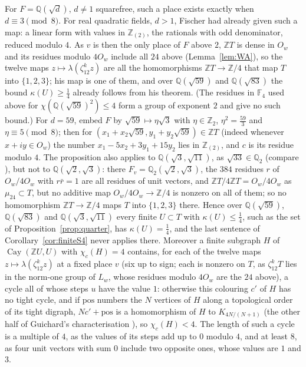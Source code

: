 \documentclass[11pt,a4paper]{amsart}
\theoremstyle{remark}
\newcommand{\Q}{\mathbb{Q}}
\newcommand{\Z}{\mathbb{Z}}
\newcommand{\F}{\mathbb{F}}
\newcommand{\Cay}{\operatorname{Cay}}
\begin{document}
For $F=\Q(\sqrt d)$, $d\ne1$ squarefree, such a place exists exactly when $d\equiv3\pmod8$. For real quadratic fields,
$d>1$, Fischer \cite[Theorem~10(i)]{Fischer1990} had already given such a map: a linear form with values in
$\Z_{(2)}$, the rationals with odd denominator, reduced modulo $4$. As $v$ is then the only place of $F$ above $2$,
$\Z T$ is dense in $O_w$ and its residues modulo $4O_w$ include all $24$ above (Lemma~\ref{lem:WA}), so the twelve maps
$z\mapsto\lambda(\zeta_{12}^kz)$ are all the homomorphisms $\Z T\to\Z/4$ that map $T$ into $\{1,2,3\}$; his map is one of
them, and over $\Q(\sqrt{59})$ and $\Q(\sqrt{83})$ the bound $\kappa(U)\ge\frac14$ already follows from his theorem.
(The residues in $\F_4$ used above for $\chi(\Q(\sqrt{59})^2)\le4$ form a group of exponent $2$ and give no such bound.)
For $d=59$, embed $F$ by $\sqrt{59}\mapsto\eta\sqrt3$ with $\eta\in\Z_2$, $\eta^2=\frac{59}3$ and $\eta\equiv5\pmod8$;
then for $(x_1+x_2\sqrt{59},y_1+y_2\sqrt{59})\in\Z T$ (indeed whenever $x+iy\in O_w$) the number
$x_1-5x_2+3y_1+15y_2$ lies in $\Z_{(2)}$, and $c$ is its residue modulo $4$. The proposition also applies to
$\Q(\sqrt3,\sqrt{11})$, as $\sqrt{33}\in\Q_2$ (compare \cite{Fischer1994}), but not to $\Q(\sqrt2,\sqrt3)$: there
$F_v=\Q_2(\sqrt2,\sqrt3)$, the $384$ residues $r$ of $O_w/4O_w$ with $r\bar r=1$ are all residues of unit vectors, and
$\Z T/4\Z T=O_w/4O_w$ as $\mu_{24}\subset T$, but no additive map $O_w/4O_w\to\Z/4$ is nonzero on all of them; so no
homomorphism $\Z T\to\Z/4$ maps $T$ into $\{1,2,3\}$ there. Hence over $\Q(\sqrt{59})$, $\Q(\sqrt{83})$ and
$\Q(\sqrt3,\sqrt{11})$ every finite $U\subset T$ with $\kappa(U)\le\frac14$, such as the set of
Proposition~\ref{prop:quarter}, has $\kappa(U)=\frac14$, and the last sentence of Corollary~\ref{cor:finiteS4} never
applies there. Moreover a finite subgraph $H$ of $\Cay(\Z U,U)$ with $\chi_c(H)=4$ contains, for each of the twelve maps
$z\mapsto\lambda(\zeta_{12}^kz)$ at a fixed place $v$ (six up to sign; each is nonzero on $T$, as $\zeta_{12}^kT$ lies
in the norm-one group of $L_w$, whose residues modulo $4O_w$ are the $24$ above), a cycle all of whose steps $u$ have
the value $1$: otherwise this colouring $c'$ of $H$ has no tight cycle, and if $\mathrm{pos}$ numbers the $N$ vertices of
$H$ along a topological order of its tight digraph, $Nc'+\mathrm{pos}$ is a homomorphism of $H$ to $K_{4N/(N+1)}$ (the
other half of Guichard's characterisation \cite{Guichard}), so $\chi_c(H)<4$. The length of such a cycle is a multiple
of $4$, as the values of its steps add up to $0$ modulo $4$, and at least $8$, as four unit vectors with sum $0$ include
two opposite ones, whose values are $1$ and $3$.
\end{document}
